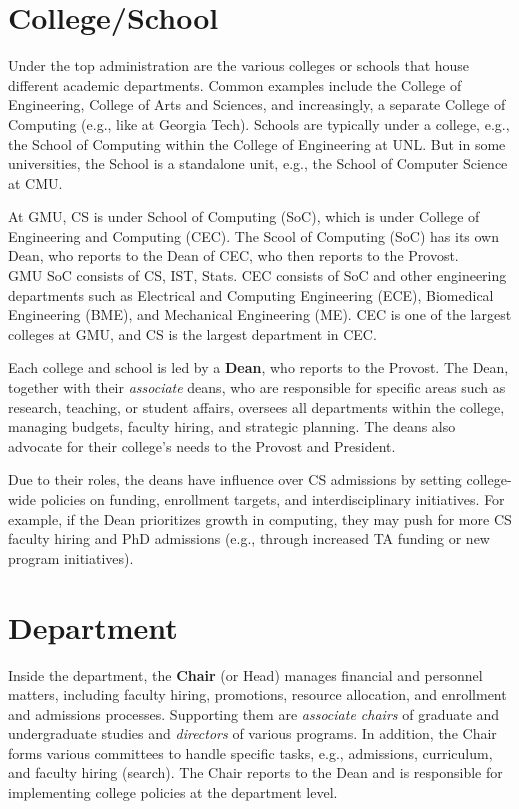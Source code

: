 \documentclass[oneside,11pt]{book}
\newenvironment{commentbox}[1][]{
  \small
  \begin{marker}[\faChessPawn{}]
    {\textbf{#1}}
  }{
  \end{marker}
}
\begin{document}
\section{College/School}

Under the top administration are the various colleges or schools that house different academic departments. Common examples include the College of Engineering, College of Arts and Sciences, and increasingly, a separate College of Computing (e.g., like at Georgia Tech).  Schools are typically under a college, e.g., the School of Computing within the College of Engineering at UNL. But in some universities, the School is a standalone unit, e.g., the School of Computer Science at CMU.

\begin{commentbox}
  At GMU, CS is under School of Computing (SoC), which is under College of Engineering and Computing (CEC).   The Scool of Computing (SoC) has its own Dean, who reports to the Dean of CEC, who then reports to the Provost.\\

  GMU SoC consists of CS, IST, Stats.  CEC consists of SoC and other engineering departments such as Electrical and Computing Engineering (ECE), Biomedical Engineering (BME), and Mechanical Engineering (ME).  CEC is one of the largest colleges at GMU, and CS is the largest department in CEC.
\end{commentbox}


Each college and school is led by a \textbf{Dean}, who reports to the Provost. The Dean, together with their \emph{associate} deans, who are responsible for specific areas such as research, teaching, or student affairs, oversees all departments within the college, managing budgets, faculty hiring, and strategic planning. The deans also advocate for their college's needs to the Provost and President.  

Due to their roles, the deans have influence over CS admissions by setting college-wide policies on funding, enrollment targets, and interdisciplinary initiatives. For example, if the Dean prioritizes growth in computing, they may push for more CS faculty hiring and PhD admissions (e.g., through increased TA funding or new program initiatives).



\section{Department}
Inside the department, the \textbf{Chair} (or Head) manages financial and personnel matters, including faculty hiring, promotions, resource allocation, and enrollment and admissions processes. Supporting them are \emph{associate chairs} of graduate and undergraduate studies and \emph{directors} of various programs. In addition, the Chair forms various committees to handle specific tasks, e.g., admissions, curriculum, and faculty hiring (search).  
The Chair reports to the Dean and is responsible for implementing college policies at the department level. 
\end{document}
